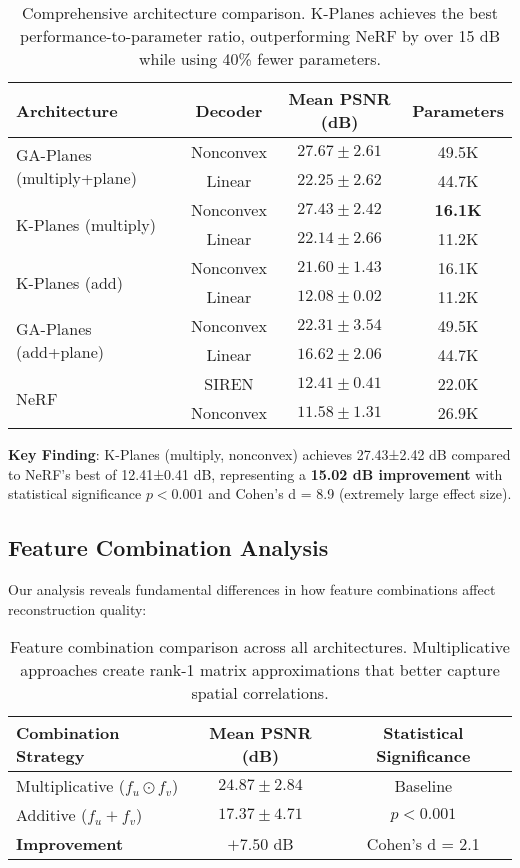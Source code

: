 \documentclass[10pt,twocolumn,letterpaper]{article}
\begin{document}
\begin{table}[t]
\centering
\small
\begin{tabular}{@{}lccc@{}}
\toprule
\textbf{Architecture} & \textbf{Decoder} & \textbf{Mean PSNR (dB)} & \textbf{Parameters} \\
\midrule
\multirow{2}{*}{GA-Planes (multiply+plane)} & Nonconvex & $\mathbf{27.67 \pm 2.61}$ & 49.5K \\
 & Linear & $22.25 \pm 2.62$ & 44.7K \\
\midrule
\multirow{2}{*}{K-Planes (multiply)} & Nonconvex & $27.43 \pm 2.42$ & \textbf{16.1K} \\
 & Linear & $22.14 \pm 2.66$ & 11.2K \\
\midrule
\multirow{2}{*}{K-Planes (add)} & Nonconvex & $21.60 \pm 1.43$ & 16.1K \\
 & Linear & $12.08 \pm 0.02$ & 11.2K \\
\midrule
\multirow{2}{*}{GA-Planes (add+plane)} & Nonconvex & $22.31 \pm 3.54$ & 49.5K \\
 & Linear & $16.62 \pm 2.06$ & 44.7K \\
\midrule
\multirow{2}{*}{NeRF} & SIREN & $12.41 \pm 0.41$ & 22.0K \\
 & Nonconvex & $11.58 \pm 1.31$ & 26.9K \\
\bottomrule
\end{tabular}
\caption{Comprehensive architecture comparison. K-Planes achieves the best performance-to-parameter ratio, outperforming NeRF by over 15 dB while using 40\% fewer parameters.}
\label{tab:primary_results}
\end{table}

\textbf{Key Finding}: K-Planes (multiply, nonconvex) achieves 27.43±2.42 dB compared to NeRF's best of 12.41±0.41 dB, representing a \textbf{15.02 dB improvement} with statistical significance $p < 0.001$ and Cohen's d = 8.9 (extremely large effect size).

\subsection{Feature Combination Analysis}

Our analysis reveals fundamental differences in how feature combinations affect reconstruction quality:

\begin{table}[t]
\centering
\small
\begin{tabular}{@{}lcc@{}}
\toprule
\textbf{Combination Strategy} & \textbf{Mean PSNR (dB)} & \textbf{Statistical Significance} \\
\midrule
Multiplicative ($f_u \odot f_v$) & $24.87 \pm 2.84$ & Baseline \\
Additive ($f_u + f_v$) & $17.37 \pm 4.71$ & $p < 0.001$ \\
\midrule
\textbf{Improvement} & $\mathbf{+7.50}$ dB & Cohen's d = 2.1 \\
\bottomrule
\end{tabular}
\caption{Feature combination comparison across all architectures. Multiplicative approaches create rank-1 matrix approximations that better capture spatial correlations.}
\label{tab:combination_analysis}
\end{table}
\end{document}
